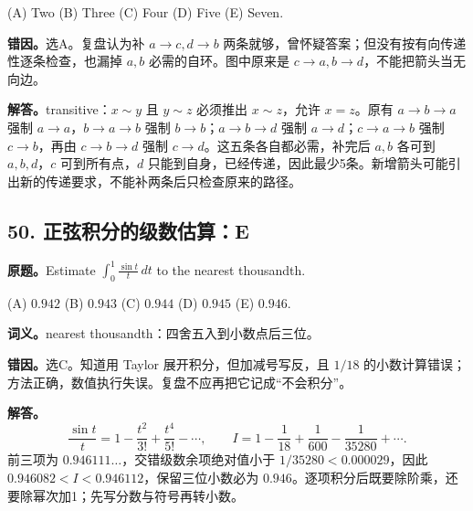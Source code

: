 \documentclass[11pt,a4paper,fontset=fandol]{ctexart}
\begin{document}
(A) Two \quad (B) Three \quad (C) Four \quad (D) Five \quad (E) Seven.

\begin{center}
\end{center}
\textbf{错因。}选A。复盘认为补 $a\to c,d\to b$ 两条就够，曾怀疑答案；但没有按有向传递性逐条检查，也漏掉 $a,b$ 必需的自环。图中原来是 $c\to a,b\to d$，不能把箭头当无向边。

\textbf{解答。}transitive：$x\sim y$ 且 $y\sim z$ 必须推出 $x\sim z$，允许 $x=z$。原有 $a\to b\to a$ 强制 $a\to a$，$b\to a\to b$ 强制 $b\to b$；$a\to b\to d$ 强制 $a\to d$；$c\to a\to b$ 强制 $c\to b$，再由 $c\to b\to d$ 强制 $c\to d$。这五条各自都必需，补完后 $a,b$ 各可到 $a,b,d$，$c$ 可到所有点，$d$ 只能到自身，已经传递，因此最少5条。新增箭头可能引出新的传递要求，不能补两条后只检查原来的路径。

\subsection{50. 正弦积分的级数估算：E}
\label{ms:q50}
\textbf{原题。}Estimate $\displaystyle\int_0^1\frac{\sin t}{t}\,dt$ to the nearest thousandth.

(A) $0.942$ \quad (B) $0.943$ \quad (C) $0.944$ \quad (D) $0.945$ \quad (E) $0.946$.

\textbf{词义。}nearest thousandth：四舍五入到小数点后三位。

\textbf{错因。}选C。知道用 Taylor 展开积分，但加减号写反，且 $1/18$ 的小数计算错误；方法正确，数值执行失误。复盘不应再把它记成“不会积分”。

\textbf{解答。}
\[
\frac{\sin t}{t}=1-\frac{t^2}{3!}+\frac{t^4}{5!}-\cdots,\qquad
I=1-\frac1{18}+\frac1{600}-\frac1{35280}+\cdots.
\]
前三项为 $0.946111\ldots$，交错级数余项绝对值小于 $1/35280<0.000029$，因此 $0.946082<I<0.946112$，保留三位小数必为 $0.946$。逐项积分后既要除阶乘，还要除幂次加1；先写分数与符号再转小数。
\end{document}

